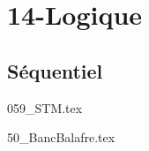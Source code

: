 \clearpage
\chapter{14-Logique}

\section{Séquentiel}

\setcounter{question}{0}
{}
\graphicspath{{../14-Logique/TD/Séquentiel/059_STM/images/}{../14-Logique/TD/Séquentiel/059_STM/}{../Style/png/}}
{059_STM.tex}

\setcounter{question}{0}
{}
\graphicspath{{../14-Logique/TD/Séquentiel/50_BancBalafre/images/}{../14-Logique/TD/Séquentiel/50_BancBalafre/}{../Style/png/}}
{50_BancBalafre.tex}

